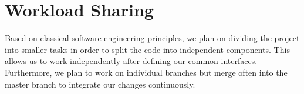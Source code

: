 \documentclass[a4paper, 11pt]{article}
\begin{document}
\section*{Workload Sharing}
Based on classical software engineering principles, we plan on dividing the project into smaller tasks in order to split the code into independent components. This allows us to work independently after defining our common interfaces.
Furthermore, we plan to work on individual branches but merge often into the master branch to integrate our changes continuously.




\end{document}
